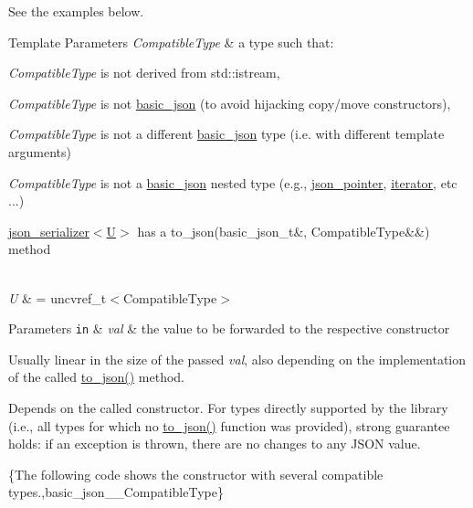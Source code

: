See the examples below.


\begin{DoxyTemplParams}{Template Parameters}
{\em Compatible\+Type} & a type such that\+:
\begin{DoxyItemize}
\item {\itshape Compatible\+Type} is not derived from {\ttfamily std\+::istream},
\item {\itshape Compatible\+Type} is not \hyperlink{classnlohmann_1_1basic__json}{basic\+\_\+json} (to avoid hijacking copy/move constructors),
\item {\itshape Compatible\+Type} is not a different \hyperlink{classnlohmann_1_1basic__json}{basic\+\_\+json} type (i.\+e. with different template arguments)
\item {\itshape Compatible\+Type} is not a \hyperlink{classnlohmann_1_1basic__json}{basic\+\_\+json} nested type (e.\+g., \hyperlink{classnlohmann_1_1json__pointer}{json\+\_\+pointer}, \hyperlink{classnlohmann_1_1basic__json_aa549b2b382916b3baafb526e5cb410bd}{iterator}, etc ...)
\item \hyperlink{classnlohmann_1_1basic__json_ad6ebc5da7ced975bb184133750e7d49f}{json\+\_\+serializer$<$\+U$>$} has a {\ttfamily to\+\_\+json(basic\+\_\+json\+\_\+t\&, Compatible\+Type\&\&)} method
\end{DoxyItemize}\\
\hline
{\em U} & = {\ttfamily uncvref\+\_\+t$<$Compatible\+Type$>$}\\
\hline
\end{DoxyTemplParams}

\begin{DoxyParams}[1]{Parameters}
\mbox{\tt in}  & {\em val} & the value to be forwarded to the respective constructor\\
\hline
\end{DoxyParams}
Usually linear in the size of the passed {\itshape val}, also depending on the implementation of the called {\ttfamily \hyperlink{namespacenlohmann_1_1detail_aaa77b0c9745130b77733a92a1a2e82ec}{to\+\_\+json()}} method.

Depends on the called constructor. For types directly supported by the library (i.\+e., all types for which no {\ttfamily \hyperlink{namespacenlohmann_1_1detail_aaa77b0c9745130b77733a92a1a2e82ec}{to\+\_\+json()}} function was provided), strong guarantee holds\+: if an exception is thrown, there are no changes to any J\+S\+ON value.

\{The following code shows the constructor with several compatible types.,basic\+\_\+json\+\_\+\+\_\+\+Compatible\+Type\}

